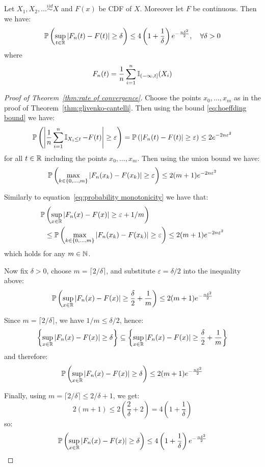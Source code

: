 \begin{theorem} \label{thm:rate of convergence}
    Let $X_1, X_2, ... \overset{iid}{\sim} X$ and $F(x)$ be CDF of $X$. Moreover let $F$ be continuous. Then we have:
    \[\P \left(\sup_{t \in \R} \left|F_n(t) - F(t) \right| \geq \delta\right)
        \leq 4\left(1 + \frac{1}{\delta}\right)e^{-\frac{n\delta^2}{2}}, \quad \forall \delta > 0\]
    where
    \[F_n(t) = \frac{1}{n} \sum_{i=1}^{n} \I_{(-\infty,t]}(X_i)\]
\end{theorem}
\begin{proof}[Proof of Theorem~\ref{thm:rate of convergence}]
    Choose the points $x_0, ..., x_m$ as in the proof of Theorem~\ref{thm:glivenko-cantelli}. Then using the bound \eqref{eq:hoeffding bound} we have:
    \[\P \left(\left|\frac{1}{n} \sum_{i=1}^{n} \I_{X_i \leq t} - F(t)\right| \geq \varepsilon\right)
        = \P \left(\left|F_n(t) - F(t)\right| \geq \varepsilon\right)
        \leq 2e^{-2 n \varepsilon^2}\]
    for all $t \in \R$ including the points $x_0, ..., x_m$. Then using the union bound we have:
    \[\P \left(\max_{k \in \{0, ..., m\}} \left|F_n(x_k) - F(x_k)\right| \geq \varepsilon\right)
        \leq 2(m+1)e^{-2 n \varepsilon^2}\]
    
    Similarly to equation~\ref{eq:probability monotonicity} we have that:
    \begin{align*}    
        \P & \left(\sup_{x \in \R} \left|F_n(x) - F(x)\right| \geq \varepsilon + 1/m\right)
        \\ &\leq \P \left(\max_{k \in \{0, ..., m\}} \left|F_n(x_k) - F(x_k)\right| \geq \varepsilon\right)
        \leq 2(m+1)e^{-2 n \varepsilon^2}
    \end{align*}
    which holds for any $m \in \N$.
    
    Now fix $\delta > 0$, choose $m = \lceil 2/\delta \rceil$, and substitute $\varepsilon = \delta/2$ into the inequality above:
    \[\P \left(\sup_{x \in \R} \left|F_n(x) - F(x)\right| \geq \frac{\delta}{2} + \frac{1}{m}\right)
        \leq 2(m + 1)e^{-\frac{n\delta^2}{2}}\]
    
    Since $m = \lceil 2/\delta \rceil$, we have $1/m \leq \delta/2$, hence:
    \[\left\{\sup_{x \in \R} \left|F_n(x) - F(x)\right| \geq \delta\right\}
        \subseteq \left\{\sup_{x \in \R} \left|F_n(x) - F(x)\right| \geq \frac{\delta}{2} + \frac{1}{m}\right\}\]
    and therefore:
    \[\P \left(\sup_{x \in \R} \left|F_n(x) - F(x)\right| \geq \delta\right)
        \leq 2(m + 1)e^{-\frac{n\delta^2}{2}}\]
    
    Finally, using $m = \lceil 2/\delta \rceil \leq 2/\delta + 1$, we get:
    \[2(m + 1) \leq 2\left(\frac{2}{\delta} + 2\right) = 4\left(1 + \frac{1}{\delta}\right)\]
    so:
    \[\P \left(\sup_{x \in \R} \left|F_n(x) - F(x)\right| \geq \delta\right)
        \leq 4\left(1 + \frac{1}{\delta}\right)e^{-\frac{n\delta^2}{2}}\]
\end{proof}

